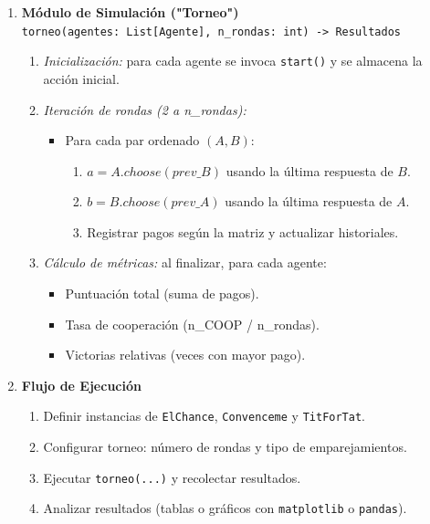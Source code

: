 \documentclass{article}
\begin{document}
\begin{enumerate}
  \item \textbf{Módulo de Simulación ("Torneo")}\\
    \texttt{torneo(agentes: List[Agente], n\_rondas: int) -> Resultados}
    \begin{enumerate}
      \item \emph{Inicialización:} para cada agente se invoca \texttt{start()} y se almacena la acción inicial.
      \item \emph{Iteración de rondas (2 a n\_rondas):}
        \begin{itemize}
          \item Para cada par ordenado $(A,B)$:
            \begin{enumerate}
              \item $a = A.choose(prev\_B)$ usando la última respuesta de $B$.
              \item $b = B.choose(prev\_A)$ usando la última respuesta de $A$.
              \item Registrar pagos según la matriz y actualizar historiales.
            \end{enumerate}
        \end{itemize}
      \item \emph{Cálculo de métricas:} al finalizar, para cada agente:
        \begin{itemize}
          \item Puntuación total (suma de pagos).
          \item Tasa de cooperación (n\_COOP / n\_rondas).
          \item Victorias relativas (veces con mayor pago).
        \end{itemize}
    \end{enumerate}

  \item \textbf{Flujo de Ejecución}
    \begin{enumerate}
      \item Definir instancias de \texttt{ElChance}, \texttt{Convenceme} y \texttt{TitForTat}.
      \item Configurar torneo: número de rondas y tipo de emparejamientos.
      \item Ejecutar \texttt{torneo(...)} y recolectar resultados.
      \item Analizar resultados (tablas o gráficos con \texttt{matplotlib} o \texttt{pandas}).
    \end{enumerate}

\end{enumerate}
\end{document}

